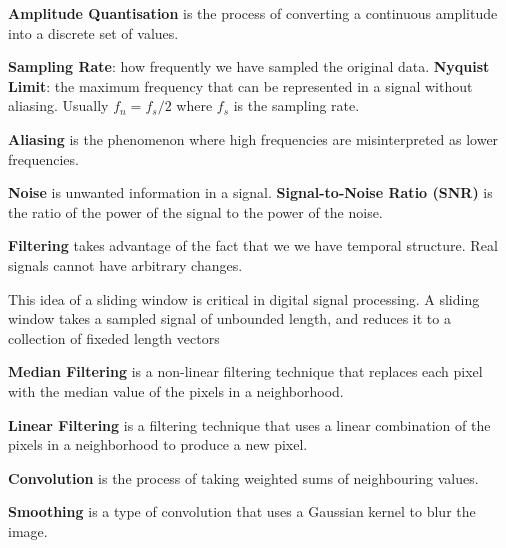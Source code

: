 \documentclass{article}
\begin{document}
\noindent \textbf{Amplitude Quantisation} is the process of converting a continuous amplitude into a discrete set of values.


\noindent \textbf{Sampling Rate}: how frequently we have sampled the original data.
\noindent \textbf{Nyquist Limit}: the maximum frequency that can be represented in a signal without aliasing.
Usually $f_n = f_s/2$ where $f_s$ is the sampling rate.


\noindent \textbf{Aliasing} is the phenomenon where high frequencies are misinterpreted as lower frequencies.


\noindent \textbf{Noise} is unwanted information in a signal.
\noindent \textbf{Signal-to-Noise Ratio (SNR)} is the ratio of the power of the signal to the power of the noise.


\noindent \textbf{Filtering} takes advantage of the fact that we we have temporal structure.
Real signals cannot have arbitrary changes.

This idea of a sliding window is critical in digital signal processing. A
sliding window takes a sampled signal of unbounded length, and reduces
it to a collection of fixeded length vectors


\noindent \textbf{Median Filtering} is a non-linear filtering technique that replaces each pixel with the median value of the pixels in a neighborhood.

\noindent \textbf{Linear Filtering} is a filtering technique that uses a linear combination of the pixels in a neighborhood to produce a new pixel.


\noindent \textbf{Convolution} is the process of taking weighted sums of neighbouring values.


\noindent \textbf{Smoothing} is a type of convolution that uses a Gaussian kernel to blur the image.

\end{document}
